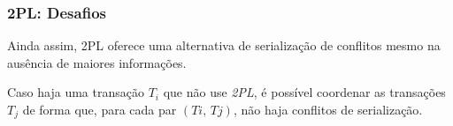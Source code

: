 \documentclass{beamer}
\begin{document}








\begin{frame} %
    \frametitle{2PL: Desafios}

    Ainda assim, 2PL oferece uma alternativa de serialização de conflitos mesmo na ausência de maiores informações. 

    \medskip
    \begin{theorem}[Serialização do 2PL]
        Caso haja uma transação \(T_{i}\) que não use \emph{2PL}, é possível coordenar as transações \(T_{j}\) de forma que, para cada par \( (Ti, \, Tj)\), não haja conflitos de serialização.
    \end{theorem}

    \medskip
\end{frame}

\end{document}
